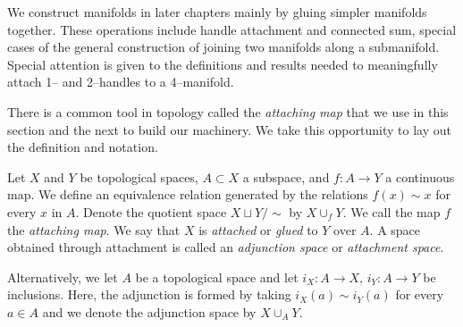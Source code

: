 \label{sec:surgery}

%	
%
%

We construct manifolds in later chapters mainly by gluing simpler manifolds together.
These operations include handle attachment and connected sum, special cases of the general construction of joining two manifolds along a submanifold.
Special attention is given to the definitions and results needed to meaningfully attach 1-- and 2--handles to a 4--manifold.

There is a common tool in topology called the \emph{attaching map} that we use in this section and the next to build our machinery.
We take this opportunity to lay out the definition and notation.

\begin{defn}
  Let $X$ and $Y$ be topological spaces, $A\subset X$ a subspace, and $f:A\to Y$ a continuous map.
  We define an equivalence relation generated by the relations $f(x)\sim x$ for every $x$ in $A$.
  Denote the quotient space $X\sqcup Y/\sim$ by $X\cup_f Y$.
  We call the map $f$ the \emph{attaching map}.  
  We say that $X$ is \emph{attached} or \emph{glued} to $Y$ over $A$.
  A space obtained through attachment is called an \emph{adjunction space} or \emph{attachment space}.
  
  Alternatively, we let $A$ be a topological space and let $i_X:A\to X$, $i_Y:A\to Y$ be inclusions.
  Here, the adjunction is formed by taking $i_X(a)\sim i_Y(a)$ for every $a\in A$ and we denote the adjunction space by $X\cup_A Y$.
\end{defn}

